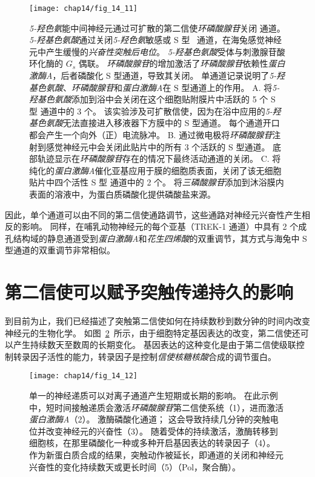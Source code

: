 \begin{figure}[htbp]
	\centering
	\texttt{[image: chap14/fig\_14\_11]}
	\caption{\textit{5-羟色氨}能中间神经元通过可扩散的第二信使\textit{环磷酸腺苷}关闭  通道。
		\textit{5-羟基色氨酸}通过关闭\textit{5-羟色氨}敏感或 S 型~ 通道，在海兔感觉神经元中产生缓慢的\textit{兴奋性突触后电位}。
		\textit{5-羟基色氨酸}受体与刺激腺苷酸环化酶的 $ G_s $ 偶联。
		\textit{环磷酸腺苷}的增加激活了\textit{环磷酸腺苷}依赖性\textit{蛋白激酶A}，后者磷酸化 S 型通道，导致其关闭。
		单通道记录说明了\textit{5-羟基色氨酸}、\textit{环磷酸腺苷}和\textit{蛋白激酶A}在 S 型通道上的作用。
		A. 将\textit{5-羟基色氨酸}添加到浴中会关闭在这个细胞贴附膜片中活跃的 5 个 S 型  通道中的 3 个。
		该实验涉及可扩散信使，因为在浴中应用的\textit{5-羟基色氨酸}无法直接进入移液器下方膜中的 S 型通道。
		每个通道开口都会产生一个向外（正）电流脉冲\cite{siegelbaum1982serotonin}。
		B. 通过微电极将\textit{环磷酸腺苷}注射到感觉神经元中会关闭此贴片中的所有 3 个活跃的 S 型通道。
		底部轨迹显示在\textit{环磷酸腺苷}存在的情况下最终活动通道的关闭\cite{siegelbaum1982serotonin}。
		C. 将纯化的\textit{蛋白激酶A}催化亚基应用于膜的细胞质表面，关闭了该无细胞贴片中四个活性 S 型  通道中的 2 个。
		将\textit{三磷酸腺苷}添加到沐浴膜内表面的溶液中，为蛋白质磷酸化提供磷酸盐来源\cite{shuster1985cyclic}。}
	\label{fig:14_11}
\end{figure}


因此，单个通道可以由不同的第二信使通路调节，这些通路对神经元兴奋性产生相反的影响。
同样，在哺乳动物神经元的每个亚基（TREK-1 通道）中具有 2 个成孔结构域的静息通道受到\textit{蛋白激酶A}和\textit{花生四烯酸}的双重调节，其方式与海兔中 S 型通道的双重调节非常相似。



\section{第二信使可以赋予突触传递持久的影响}

到目前为止，我们已经描述了突触第二信使如何在持续数秒到数分钟的时间内改变神经元的生物化学。
如图~\ref{fig:14_12}~所示，由于细胞特定基因表达的改变，第二信使还可以产生持续数天至数周的长期变化。
基因表达的这种变化是由于第二信使级联控制转录因子活性的能力，转录因子是控制\textit{信使核糖核酸}合成的调节蛋白。


\begin{figure}[htbp]
	\centering
	\texttt{[image: chap14/fig\_14\_12]}
	\caption{单一的神经递质可以对离子通道产生短期或长期的影响。
		在此示例中，短时间接触递质会激活\textit{环磷酸腺苷}第二信使系统（1），进而激活\textit{蛋白激酶A}（2）。
		激酶磷酸化通道；
		这会导致持续几分钟的突触电位并改变神经元的兴奋性（3）。
		随着受体的持续激活，激酶转移到细胞核，在那里磷酸化一种或多种开启基因表达的转录因子（4）。
		作为新蛋白质合成的结果，突触动作被延长，即通道的关闭和神经元兴奋性的变化持续数天或更长时间（5）（Pol，聚合酶）。}
	\label{fig:14_12}
\end{figure}


